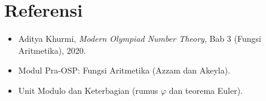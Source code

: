 \documentclass[12pt]{scrartcl}
\begin{document}
\section{Referensi}
\begin{itemize}
    \item Aditya Khurmi, \textit{Modern Olympiad Number Theory},
    Bab 3 (Fungsi Aritmetika), 2020.
    \item Modul Pra-OSP: Fungsi Aritmetika (Azzam dan Akeyla).
    \item Unit Modulo dan Keterbagian (rumus $\varphi$ dan teorema Euler).
\end{itemize}
\end{document}
